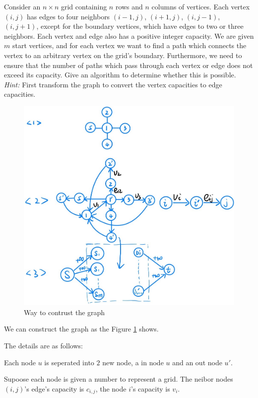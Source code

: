\problem{}
Consider an $n \times n$ grid containing $n$ rows and $n$ columns of vertices.  Each vertex $(i, j)$ has edges to four neighbors $(i-1, j)$, $(i+1, j)$, $(i, j-1)$, $(i, j+1)$, except for the boundary vertices, which have edges to two or three neighbors.  Each vertex and edge also has a positive integer capacity.  We are given $m $ start vertices, and for each vertex we want to find a path which connects the vertex to an arbitrary vertex on the grid's boundary.  Furthermore, we need to ensure that the number of paths which pass through each vertex or edge does not exceed its capacity.  Give an algorithm to determine whether this is possible. \\

\noindent \emph{Hint:}  First transform the graph to convert the vertex capacities to edge capacities.  

\solution{}
\begin{figure}[htbp]
    \centering
    \includegraphics[width=0.9\linewidth]{../fig/p4.png}
    \caption{Way to contrust the graph}
    \label{fig:p4}
\end{figure}

We can construct the graph as the Figure \ref{fig:p4} shows.

The details are as follows:

Each node $u$ is seperated into $2$ new node, a in node $u$ and an out node $u'$.

Supoose each node is given a number to represent a grid. The neibor nodes $(i,j)$'s edge's capacity is $c_{i,j}$, the node $i$'s capacity is $v_i$.

